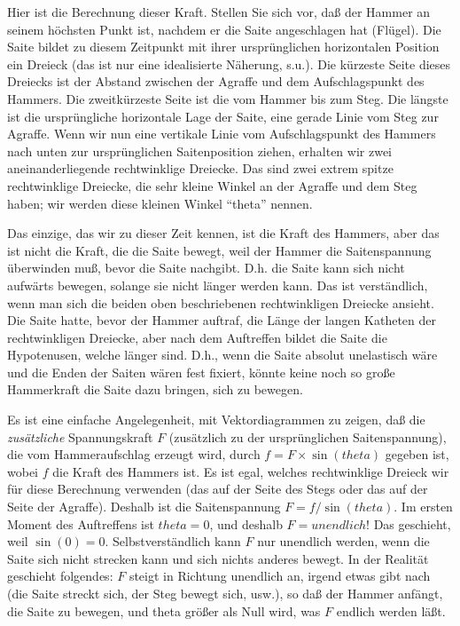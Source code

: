 Hier ist die Berechnung dieser Kraft.
Stellen Sie sich vor, daß der Hammer an seinem höchsten Punkt ist, nachdem er die Saite angeschlagen hat (Flügel).
Die Saite bildet zu diesem Zeitpunkt mit ihrer ursprünglichen horizontalen Position ein Dreieck (das ist nur eine idealisierte Näherung, s.u.).
Die kürzeste Seite dieses Dreiecks ist der Abstand zwischen der Agraffe und dem Aufschlagspunkt des Hammers.
Die zweitkürzeste Seite ist die vom Hammer bis zum Steg.
Die längste ist die ursprüngliche horizontale Lage der Saite, eine gerade Linie vom Steg zur Agraffe.
Wenn wir nun eine vertikale Linie vom Aufschlagspunkt des Hammers nach unten zur ursprünglichen Saitenposition ziehen, erhalten wir zwei aneinanderliegende rechtwinklige Dreiecke.
Das sind zwei extrem spitze rechtwinklige Dreiecke, die sehr kleine Winkel an der Agraffe und dem Steg haben; wir werden diese kleinen Winkel \enquote{theta} nennen.

Das einzige, das wir zu dieser Zeit kennen, ist die Kraft des Hammers, aber das ist nicht die Kraft, die die Saite bewegt, weil der Hammer die Saitenspannung überwinden muß, bevor die Saite nachgibt.
D.h. die Saite kann sich nicht aufwärts bewegen, solange sie nicht länger werden kann.
Das ist verständlich, wenn man sich die beiden oben beschriebenen rechtwinkligen Dreiecke ansieht.
Die Saite hatte, bevor der Hammer auftraf, die Länge der langen Katheten der rechtwinkligen Dreiecke, aber nach dem Auftreffen bildet die Saite die Hypotenusen, welche länger sind.
D.h., wenn die Saite absolut unelastisch wäre und die Enden der Saiten wären fest fixiert, könnte keine noch so große Hammerkraft die Saite dazu bringen, sich zu bewegen.

Es ist eine einfache Angelegenheit, mit Vektordiagrammen zu zeigen, daß die \textit{zusätzliche} Spannungskraft $F$ (zusätzlich zu der ursprünglichen Saitenspannung), die vom Hammeraufschlag erzeugt wird, durch $f = F\times\sin(theta)$ gegeben ist, wobei $f$ die Kraft des Hammers ist.
Es ist egal, welches rechtwinklige Dreieck wir für diese Berechnung verwenden (das auf der Seite des Stegs oder das auf der Seite der Agraffe).
Deshalb ist die Saitenspannung $F = f/\sin(theta)$.
Im ersten Moment des Auftreffens ist $theta = 0$, und deshalb $F = unendlich$!
Das geschieht, weil $\sin(0) = 0$.
Selbstverständlich kann $F$ nur unendlich werden, wenn die Saite sich nicht strecken kann und sich nichts anderes bewegt.
In der Realität geschieht folgendes: $F$ steigt in Richtung unendlich an, irgend etwas gibt nach (die Saite streckt sich, der Steg bewegt sich, usw.), so daß der Hammer anfängt, die Saite zu bewegen, und theta größer als Null wird, was $F$ endlich werden läßt.

